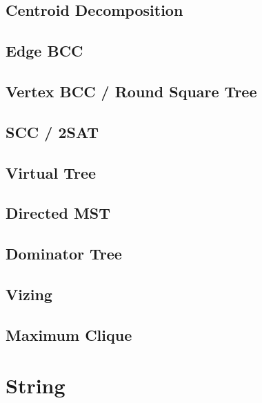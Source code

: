 \subsection{Centroid Decomposition}

\subsection{Edge BCC}
\subsection{Vertex BCC / Round Square Tree}
\subsection{SCC / 2SAT}
% 
\subsection{Virtual Tree}

\subsection{Directed MST} %
\subsection{Dominator Tree}
\subsection{Vizing}

\subsection{Maximum Clique}

\section{String}
